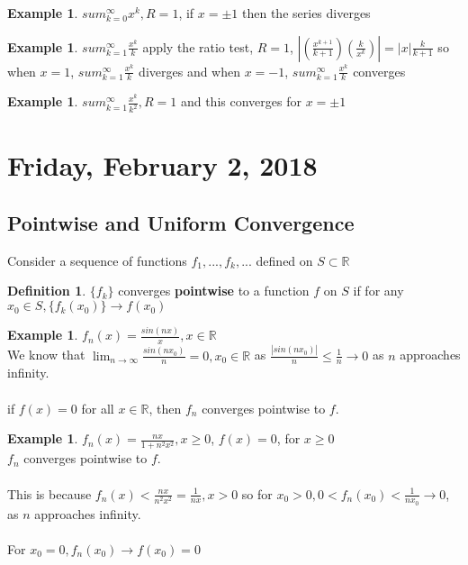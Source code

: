 \documentclass[12pt]{article}
\theoremstyle{plain}
\theoremstyle{definition}
\newtheorem{definition}[theorem]{Definition}
\newtheorem{example}[theorem]{Example}
\begin{document}
\begin{example}
	$sum^\infty_{k=0} x^k, R=1$, if $x=\pm 1$ then the series diverges
\end{example}

\begin{example}
	$sum^\infty_{k=1} \frac{x^k}{k}$ apply the ratio test, $R =1$, $|(\frac{x^{k+1}}{k+1}) (\frac{k}{x^k})| = |x| \frac{k}{k+1}$
	so when $x=1$, $sum^\infty_{k=1} \frac{x^k}{k}$ diverges
	and when $x=-1$, $sum^\infty_{k=1} \frac{x^k}{k}$ converges
\end{example}

\begin{example}
	$sum^\infty_{k=1} \frac{x^k}{k^2}, R=1$ and this converges for $x=\pm 1$  
\end{example}

\newpage

\section{Friday, February 2, 2018}

\subsection{Pointwise and Uniform Convergence}

Consider a sequence of functions $f_1, ... ,f_k, ...$ defined on $S \subset \mathbb{R}$\\

\begin{definition}
$\{ f_k \}$ converges \textbf{pointwise} to a function $f$ on $S$ if for any $x_0 \in S, \{ f_k (x_0) \} \to f(x_0)$

\end{definition}

\begin{example}
	$f_n (x) = \frac{sin(nx)}{x}, x\in\mathbb{R}$\\
	
	We know that $\lim_{n\to\infty} \frac{sin(n x_0)}{n} = 0, x_0 \in\mathbb{R}$ as
	$\frac{|sin(n x_0)|}{n} \leq \frac{1}{n} \to 0$ as $n$ approaches infinity.\\
	\\
	if $f(x) = 0$ for all $x\in\mathbb{R}$, then $f_n$ converges pointwise to $f$.
\end{example}

\begin{example}
	$f_n (x) = \frac{nx}{1 + n^2 x^2}, x \geq 0$, $f(x) = 0$, for $x \geq 0$
	\\
	$f_n$ converges pointwise to $f$.\\
	\\
	This is because $f_n (x) < \frac{nx}{n^2 x^2} = \frac{1}{nx}, x > 0$ so for $x_0 > 0, 0 < f_n (x_0) < \frac{1}{n x_0} \to 0$, as $n$ approaches infinity.\\
	\\
	For $x_0 = 0, f_n (x_0) \to f(x_0) = 0$
\end{example}
\end{document}
